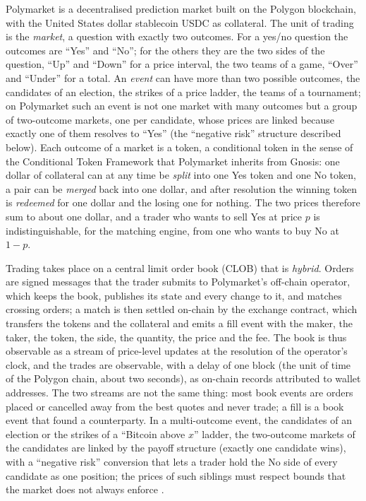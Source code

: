 Polymarket is a decentralised prediction market built on the Polygon blockchain, with
the United States dollar stablecoin USDC as collateral.  The unit of trading is the
\emph{market}, a question with exactly two outcomes.  For a yes/no question the outcomes
are ``Yes'' and ``No''; for the others they are the two sides of the question, ``Up'' and
``Down'' for a price interval, the two teams of a game, ``Over'' and ``Under'' for a total.
An \emph{event} can have more than two possible outcomes, the candidates of an election,
the strikes of a price ladder, the teams of a tournament; on Polymarket such an event is
not one market with many outcomes but a group of two-outcome markets, one per candidate,
whose prices are linked because exactly one of them resolves to ``Yes'' (the
``negative risk'' structure described below).  Each outcome of a market is a token, a
conditional token in the sense of the Conditional Token Framework that Polymarket inherits
from Gnosis: one dollar of collateral can at any time be \emph{split} into one Yes token and
one No token, a pair can be \emph{merged} back into one dollar, and after resolution the
winning token is \emph{redeemed} for one dollar and the losing one for nothing.  The two
prices therefore sum to about one dollar, and a trader who wants to sell Yes at price $p$
is indistinguishable, for the matching engine, from one who wants to buy No at $1 - p$.

Trading takes place on a central limit order book (CLOB) that is \emph{hybrid}.  Orders
are signed messages that the trader submits to Polymarket's off-chain operator, which
keeps the book, publishes its state and every change to it, and matches crossing orders;
a match is then settled on-chain by the exchange contract, which transfers the tokens and
the collateral and emits a fill event with the maker, the taker, the token, the side, the
quantity, the price and the fee.  The book is thus observable as a stream of price-level
updates at the resolution of the operator's clock, and the trades are observable, with a
delay of one block (the unit of time of the Polygon chain, about two seconds), as on-chain
records attributed to wallet addresses.  The two streams
are not the same thing: most book events are orders placed or cancelled away from the best
quotes and never trade; a fill is a book event that found a counterparty.  In a
multi-outcome event, the candidates of an election or the strikes of a ``Bitcoin above $x$''
ladder, the two-outcome markets of the candidates are linked by the payoff structure
(exactly one candidate wins), with a ``negative risk'' conversion that lets a trader hold
the No side of every candidate as one position; the prices of such siblings must respect
bounds that the market does not always enforce \cite{gebele2026arbitrage}.

